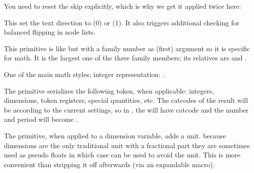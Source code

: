 \startbuffer
\halign{%
    \aligncontent             \aligntab
    \aligncontent\tabskip 3cm \aligntab
    \aligncontent             \aligntab
    \aligncontent\tabskip 0cm \cr
    1  \aligntab 111\aligntab 1111\aligntab 11\cr
    222\aligntab 2  \aligntab 2222\aligntab 22\cr
}
\stopbuffer

\typebuffer

You need to reset the skip explicitly, which is why we get it applied twice here:

\blank {\showboxes \getbuffer} \blank

\stopoldprimitive

\startnewprimitive[title={\prm {textdirection}}]

This set the text direction to  (0) or  (1). It also
triggers additional checking for balanced flipping in node lists.

\stopnewprimitive

\startoldprimitive[title={\prm {textfont}}]

This primitive is like  but with a family number as (first) argument
so it is specific for math. It is the largest one of the three family members; its
relatives are  and .

\stopoldprimitive

\startoldprimitive[title={\prm {textstyle}}]

One of the main math styles; integer representation: \the\textstyle.

\stopoldprimitive

\startoldprimitive[title={\prm {the}}]

The  primitive serializes the following token, when applicable:
integers, dimensions, token registers, special quantities, etc. The catcodes of
the result will be according to the current settings, so in ,
the  will have catcode  and the number and period will
become .

\stopoldprimitive

\startnewprimitive[title={\prm {thewithoutunit}}]

The  primitive, when applied to a dimension variable, adds a 
unit. because dimensions are the only traditional unit with a fractional part
they are sometimes used as pseudo floats in which case  can
be used to avoid the unit. This is more convenient than stripping it off
afterwards (via an expandable macro).

